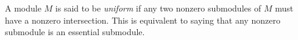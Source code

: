 \documentclass[12pt]{article}
\begin{document}
A module $M$ is said to be {\it uniform} if any two nonzero submodules of $M$ must have a nonzero intersection.  This is equivalent to saying that any nonzero submodule is an essential submodule.
\end{document}
